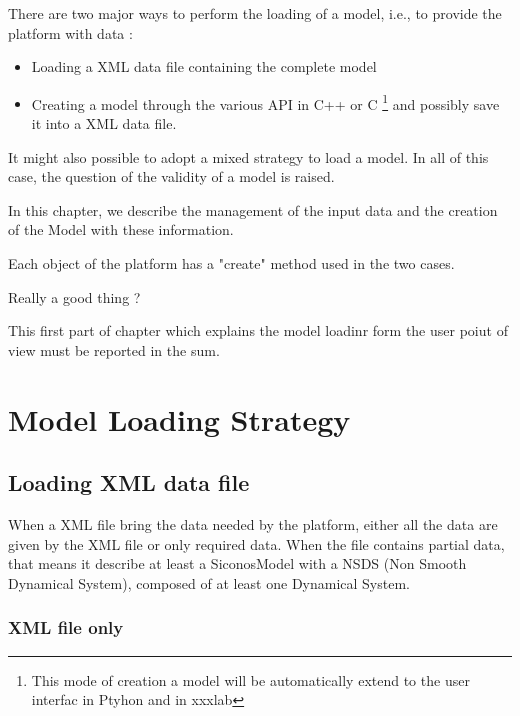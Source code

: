 

There are two major ways  to perform the loading of a model, i.e., to provide  the platform with data :
\begin{itemize}
\item Loading a XML data file containing the complete model
\item Creating a model through the various API in C++ or C \footnote{This mode of creation a model will be automatically extend to the user interfac in Ptyhon and in xxxlab} and possibly save it into a XML data file.  
\end{itemize}
It might also possible to adopt a mixed strategy to load a model. In all of this case, the question of the validity of a model is raised.

In this chapter, we describe the management of the input data and the
creation of the Model with these information.


Each object of the platform has a "create" method used in the two cases.
\begin{ndr}
  Really a good thing ?
\end{ndr}

This first  part of chapter which explains  the model loadinr form the user poiut of view  must be reported in the \ac{sum}. 

\section{Model Loading Strategy}

\subsection{Loading XML data file}

When a XML file bring the data needed by the platform, either all the data are given by the XML
file or only required data. When the file contains partial data, that means it describe at least
a SiconosModel with a NSDS (Non Smooth Dynamical System), composed of at least one Dynamical
System.


\subsubsection{XML file only}

